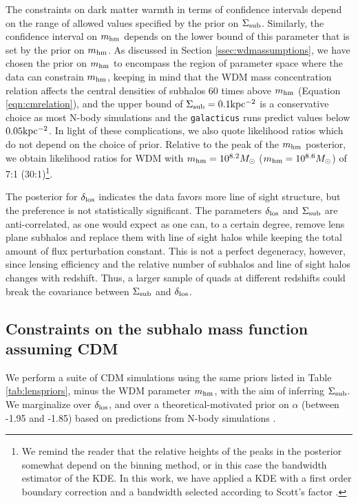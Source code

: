 The constraints on dark matter warmth in terms of confidence intervals depend on the range of allowed values specified by the prior on $\Sigma_{\rm{sub}}$. Similarly, the confidence interval on ${m_{\rm{hm}}}$ depends on the lower bound of this parameter that is set by the prior on ${m_{\rm{hm}}}$. As discussed in Section \ref{ssec:wdmassumptions}, we have chosen the prior on ${m_{\rm{hm}}}$ to encompass the region of parameter space where the data can constrain ${m_{\rm{hm}}}$, keeping in mind that the WDM mass concentration relation affects the central densities of subhalos 60 times above ${m_{\rm{hm}}}$ (Equation \ref{eqn:cmrelation}), and the upper bound of $\Sigma_{\rm{sub}} = 0.1 \rm{kpc^{-2}}$ is a conservative choice as most N-body simulations and the {\tt{galacticus}} runs predict values below $0.05 \rm{kpc^{-2}}$. In light of these complications, we also quote likelihood ratios which do not depend on the choice of prior. Relative to the peak of the ${m_{\rm{hm}}}$ posterior, we obtain likelihood ratios for WDM with ${m_{\rm{hm}}} = 10^{8.2}{M_{\odot}}$ (${m_{\rm{hm}}} = 10^{8.6}{M_{\odot}}$) of 7:1 (30:1)\footnote{We remind the reader that the relative heights of the peaks in the posterior somewhat depend on the binning method, or in this case the bandwidth estimator of the KDE. In this work, we have applied a KDE with a first order boundary correction and a bandwidth selected according to Scott's factor \cite{Scott92}.}. 

The posterior for $\delta_{\rm{los}}$ indicates the data favors more line of sight structure, but the preference is not statistically significant. The parameters $\delta_{\rm{los}}$ and $\Sigma_{\rm{sub}}$ are anti-correlated, as one would expect as one can, to a certain degree, remove lens plane subhalos and replace them with line of sight halos while keeping the total amount of flux perturbation constant. This is not a perfect degeneracy, however, since lensing efficiency and the relative number of subhalos and line of sight halos changes with redshift. Thus, a larger sample of quads at different redshifts could break the covariance between $\Sigma_{\rm{sub}}$ and $\delta_{\rm{los}}$. 

\subsection{Constraints on the subhalo mass function assuming CDM}

We perform a suite of CDM simulations using the same priors listed in Table \ref{tab:lenspriors}, minus the WDM parameter $m_{\rm{hm}}$, with the aim of inferring $\Sigma_{\rm{sub}}$. We marginalize over $\delta_{\rm{los}}$, and over a theoretical-motivated prior on $\alpha$ (between -1.95 and -1.85) based on predictions from N-body simulations \cite{Springel++08,Fiacconi++16}.

